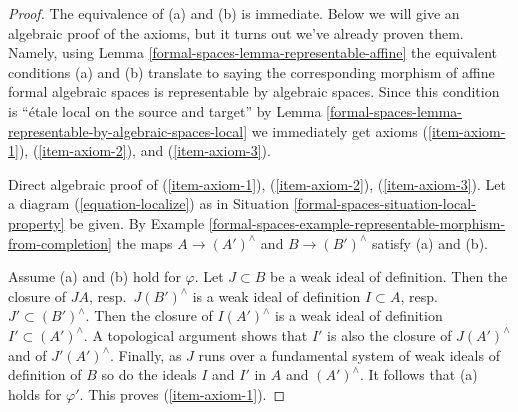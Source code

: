 \begin{proof}
The equivalence of (a) and (b) is immediate. Below we will give an
algebraic proof of the axioms, but it turns out we've already proven
them. Namely, using Lemma \ref{formal-spaces-lemma-representable-affine}
the equivalent conditions (a) and (b) translate to saying the
corresponding morphism of affine formal algebraic spaces is representable
by algebraic spaces.
Since this condition is ``\'etale local on the source and target'' by
Lemma \ref{formal-spaces-lemma-representable-by-algebraic-spaces-local}
we immediately get axioms (\ref{item-axiom-1}), (\ref{item-axiom-2}), and
(\ref{item-axiom-3}).

\medskip\noindent
Direct algebraic proof of (\ref{item-axiom-1}), (\ref{item-axiom-2}),
(\ref{item-axiom-3}). Let a diagram (\ref{equation-localize}) as in
Situation \ref{formal-spaces-situation-local-property} be given.
By Example \ref{formal-spaces-example-representable-morphism-from-completion}
the maps $A \to (A')^\wedge$ and $B \to (B')^\wedge$
satisfy (a) and (b).

\medskip\noindent
Assume (a) and (b) hold for $\varphi$. Let $J \subset B$ be a weak ideal
of definition. Then the closure of $JA$, resp.\ $J(B')^\wedge$
is a weak ideal of definition $I \subset A$, resp.\ $J' \subset (B')^\wedge$.
Then the closure of $I(A')^\wedge$ is a weak ideal of definition
$I' \subset (A')^\wedge$. A topological argument shows that $I'$ is also
the closure of $J(A')^\wedge$ and of $J'(A')^\wedge$.
Finally, as $J$ runs over a fundamental system of weak ideals of definition
of $B$ so do the ideals $I$ and $I'$ in $A$ and $(A')^\wedge$.
It follows that (a) holds for $\varphi'$. This proves (\ref{item-axiom-1}).


\end{proof}
